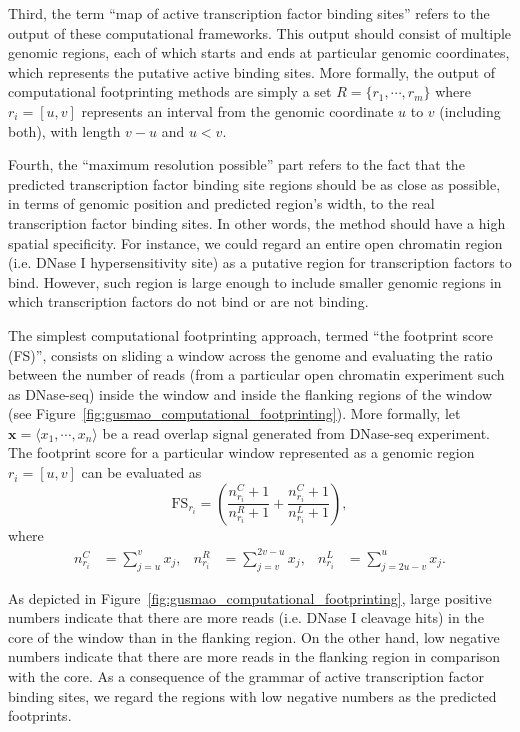Third, the term ``map of active transcription factor binding sites'' refers to the output of these computational frameworks. This output should consist of multiple genomic regions, each of which starts and ends at particular genomic coordinates, which represents the putative active binding sites. More formally, the output of computational footprinting methods are simply a set $R = \{r_1, \cdots, r_m\}$ where $r_i = [u, v]$ represents an interval from the genomic coordinate $u$ to $v$ (including both), with length $v-u$ and $u<v$.

Fourth, the ``maximum resolution possible'' part refers to the fact that the predicted transcription factor binding site regions should be as close as possible, in terms of genomic position and predicted region's width, to the real transcription factor binding sites. In other words, the method should have a high spatial specificity. For instance, we could regard an entire open chromatin region (i.e. DNase I hypersensitivity site) as a putative region for transcription factors to bind. However, such region is large enough to include smaller genomic regions in which transcription factors do not bind or are not binding.

The simplest computational footprinting approach, termed ``the footprint score (FS)'', consists on sliding a window across the genome and evaluating the ratio between the number of reads (from a particular open chromatin experiment such as DNase-seq) inside the window and inside the flanking regions of the window (see Figure~\ref{fig:gusmao_computational_footprinting}). More formally, let $\mathbf{x} = \langle x_1, \cdots, x_n \rangle$ be a read overlap signal generated from DNase-seq experiment. The footprint score for a particular window represented as a genomic region $r_i = [u, v]$ can be evaluated as
\begin{equation}
  \label{eq:fs1}
  \text{FS}_{r_i} = \left(\frac{{n}^{C}_{r_i}+1}{{n}^{R}_{r_i}+1} + \frac{{n}^{C}_{r_i}+1}{{n}^{L}_{r_i}+1}\right),
\end{equation}
where
\begin{align}
  \label{eq:fs2}
  {n}^{C}_{r_i} &= \sum_{j=u}^{v} {x}_{j}, &
  {n}^{R}_{r_i} &= \sum_{j=v}^{2v-u} {x}_{j}, &
  {n}^{L}_{r_i} &= \sum_{j=2u-v}^{u} {x}_{j}.
\end{align}

As depicted in Figure~\ref{fig:gusmao_computational_footprinting}, large positive numbers indicate that there are more reads (i.e. DNase I cleavage hits) in the core of the window than in the flanking region. On the other hand, low negative numbers indicate that there are more reads in the flanking region in comparison with the core. As a consequence of the grammar of active transcription factor binding sites, we regard the regions with low negative numbers as the predicted footprints.

